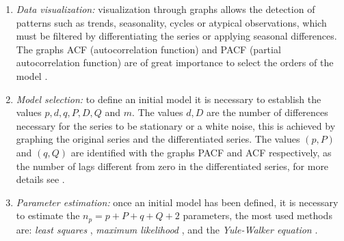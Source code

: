 \begin{enumerate}
	\item \textit{Data visualization:} visualization through graphs allows the detection of patterns such as trends, seasonality, cycles or atypical observations, which must be filtered by differentiating the series or applying seasonal differences. The graphs ACF (autocorrelation function) \citet{acf} and PACF (partial autocorrelation function) \citet{acf} are of great importance to select the orders of the model \citet{rob}.
	
	\item \textit{Model selection: }to define an initial model it is necessary to establish the values $ p, d, q, P, D, Q $ and $ m $. The values $ d, D $ are the number of differences necessary for the series to be stationary or a white noise, this is achieved by graphing the original series and the differentiated series. The values $ (p, P) $ and $ (q, Q) $ are identified with the graphs PACF and ACF respectively, as the number of lags different from zero in the differentiated series, for more details see \cite{rob}.
	
	\item \textit{Parameter estimation:} once an initial model has been defined, it is necessary to estimate the $ n_p = p + P + q + Q + 2 $ parameters, the most used methods are:\textit{ least squares} \citet{MLE}, \textit{maximum likelihood} \citet{MLE}, and the \textit{Yule-Walker equation} \citet{yule1,yule2}.
	

\end{enumerate}
